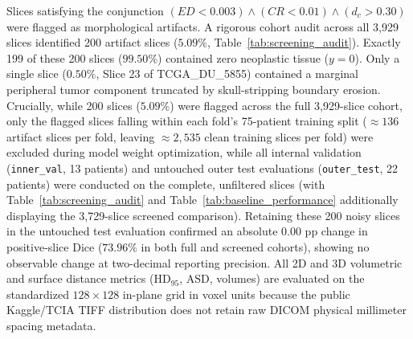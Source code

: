 \documentclass[preprint,12pt,authoryear]{elsarticle}
\begin{document}
Slices satisfying the conjunction $(ED < 0.003) \land (CR < 0.01) \land (d_c > 0.30)$ were flagged as morphological artifacts. A rigorous cohort audit across all 3,929 slices identified 200 artifact slices ($5.09\%$, Table~\ref{tab:screening_audit}). Exactly 199 of these 200 slices ($99.50\%$) contained zero neoplastic tissue ($y = 0$). Only a single slice ($0.50\%$, Slice 23 of TCGA\_DU\_5855) contained a marginal peripheral tumor component truncated by skull-stripping boundary erosion. Crucially, while 200 slices ($5.09\%$) were flagged across the full 3,929-slice cohort, only the flagged slices falling within each fold's 75-patient training split ($\approx 136$ artifact slices per fold, leaving $\approx 2,535$ clean training slices per fold) were excluded during model weight optimization, while all internal validation (\texttt{inner\_val}, 13 patients) and untouched outer test evaluations (\texttt{outer\_test}, 22 patients) were conducted on the complete, unfiltered slices (with Table~\ref{tab:screening_audit} and Table~\ref{tab:baseline_performance} additionally displaying the 3,729-slice screened comparison). Retaining these 200 noisy slices in the untouched test evaluation confirmed an absolute $0.00\text{ pp}$ change in positive-slice Dice ($73.96\%$ in both full and screened cohorts), showing no observable change at two-decimal reporting precision. All 2D and 3D volumetric and surface distance metrics ($\text{HD}_{95}$, $\text{ASD}$, volumes) are evaluated on the standardized $128 \times 128$ in-plane grid in voxel units because the public Kaggle/TCIA TIFF distribution does not retain raw DICOM physical millimeter spacing metadata.
\end{document}
